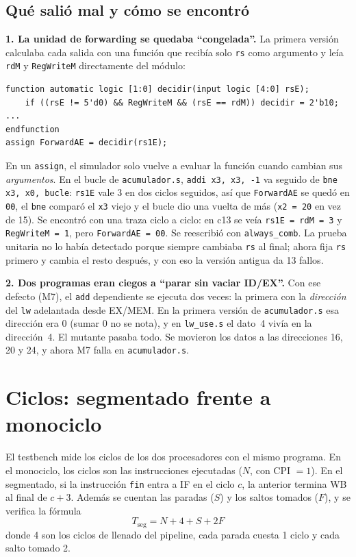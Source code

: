 \documentclass[11pt,letterpaper]{article}
\newcommand{\cod}[1]{\texttt{#1}}
\begin{document}
\subsection{Qu\'e sali\'o mal y c\'omo se encontr\'o}
\textbf{1. La unidad de forwarding se quedaba ``congelada''.} La primera versi\'on calculaba cada
salida con una funci\'on que recib\'ia solo \cod{rs} como argumento y le\'ia \cod{rdM} y
\cod{RegWriteM} directamente del m\'odulo:
\begin{lstlisting}[language=SV, numbers=none]
function automatic logic [1:0] decidir(input logic [4:0] rsE);
    if ((rsE != 5'd0) && RegWriteM && (rsE == rdM)) decidir = 2'b10; ...
endfunction
assign ForwardAE = decidir(rs1E);
\end{lstlisting}
En un \cod{assign}, el simulador solo vuelve a evaluar la funci\'on cuando cambian sus
\emph{argumentos}. En el bucle de \cod{acumulador.s}, \cod{addi x3, x3, -1} va seguido de
\cod{bne x3, x0, bucle}: \cod{rs1E} vale 3 en dos ciclos seguidos, as\'i que \cod{ForwardAE} se qued\'o
en \cod{00}, el \cod{bne} compar\'o el \cod{x3} viejo y el bucle dio una vuelta de m\'as
(\cod{x2 = 20} en vez de 15). Se encontr\'o con una traza ciclo a ciclo: en c13 se ve\'ia
\cod{rs1E = rdM = 3} y \cod{RegWriteM = 1}, pero \cod{ForwardAE = 00}. Se reescribi\'o con
\cod{always\_comb}. La prueba unitaria no lo hab\'ia detectado porque siempre cambiaba \cod{rs} al
final; ahora fija \cod{rs} primero y cambia el resto despu\'es, y con eso la versi\'on antigua da
13 fallos.

\textbf{2. Dos programas eran ciegos a ``parar sin vaciar ID/EX''.} Con ese defecto (M7), el
\cod{add} dependiente se ejecuta dos veces: la primera con la \emph{direcci\'on} del \cod{lw}
adelantada desde EX/MEM. En la primera versi\'on de \cod{acumulador.s} esa direcci\'on era 0 (sumar
0 no se nota), y en \cod{lw\_use.s} el dato~4 viv\'ia en la direcci\'on~4. El mutante pasaba todo. Se
movieron los datos a las direcciones 16, 20 y 24, y ahora M7 falla en \cod{acumulador.s}.

\section{Ciclos: segmentado frente a monociclo}

El testbench mide los ciclos de los dos procesadores con el mismo programa. En el monociclo, los
ciclos son las instrucciones ejecutadas ($N$, con CPI $=1$). En el segmentado, si la instrucci\'on
\cod{fin} entra a IF en el ciclo $c$, la anterior termina WB al final de $c+3$. Adem\'as se cuentan las
paradas ($S$) y los saltos tomados ($F$), y se verifica la f\'ormula
\[
\boxed{\;T_{\text{seg}} = N + 4 + S + 2F\;}
\]
donde 4 son los ciclos de llenado del pipeline, cada parada cuesta 1 ciclo y cada salto tomado 2.
\end{document}
